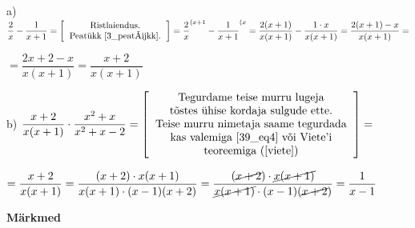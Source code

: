 \begin{center}
{{{\begin{flushleft}
\vspace{2mm}
\hspace{5mm}
a) $ \dfrac{2}{x} - \dfrac{1}{x+1} = \left[ \begin{tabular}{c}
Ristlaiendus.\\
Peatükk \ref{3_peatükk}.
\end{tabular}
\right] = \dfrac{2}{x}^{(x+1} - \dfrac{1}{x+1}^{(x} = \dfrac{2(x+1)}{x(x+1)} - \dfrac{1\cdot x}{x(x+1)}=\dfrac{2(x+1)-x}{x(x+1)} = $

\vspace{5mm}
\hspace{5mm}
$=\dfrac{2x+2-x}{x(x+1)}=\dfrac{x+2}{x(x+1)}$

\vspace{5mm}
\hspace{5mm}
b) $\dfrac{x+2}{x(x+1)}\cdot \dfrac{x^{2}+x}{x^{2}+x-2}= \left[ \begin{tabular}{c}
Tegurdame teise murru lugeja\\
tõstes ühise kordaja sulgude ette.\\
Teise murru nimetaja saame tegurdada\\
kas valemiga \ref{39_eq4} või Viete'i\\
teoreemiga (\ref{viete})
\end{tabular} \right]=$

\vspace{5mm}
\hspace{5mm}
$= \dfrac{x+2}{x(x+1)}=\dfrac{(x+2) \cdot x(x+1)}{x(x+1)\cdot (x-1)(x+2)}= \dfrac{(\cancel{x+2}) \cdot \cancel{x(x+1)}}{ \cancel{x(x+1)}\cdot (x-1)(\cancel{x+2})}=\dfrac{1}{x-1}$
\end{flushleft}
}}}
\end{center}

\vspace{0.5cm}

\textbf{Märkmed}\\
\vspace{2mm}
\begin{mdframed}[style=graphpaper]
\vspace{3cm}
\end{mdframed}